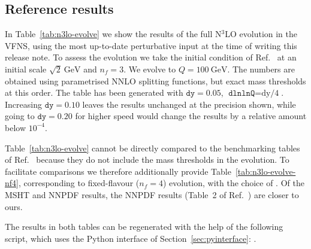 \subsection{Reference results}

In Table~\ref{tab:n3lo-evolve} we show the results of the full N$^3$LO
evolution in the VFNS, using the most up-to-date perturbative input at
the time of writing this release note. To assess the evolution we take
the initial condition of Ref.~\cite{Dittmar:2005ed} at an initial
scale $\sqrt{2}~\text{GeV}$ and $n_f=3$. We evolve to
$Q=100~\text{GeV}$. The numbers are obtained using parametrised NNLO
splitting functions, but exact mass thresholds at this order.
%
The table has been generated with $\texttt{dy}=0.05$,
$\texttt{dlnlnQ}=\text{dy/4}$.
%
Increasing $\texttt{dy}=0.10$ leaves the results unchanged at the
precision shown, while going to $\texttt{dy}=0.20$ for higher speed
would change the results by a relative amount below $10^{-4}$.

Table~\ref{tab:n3lo-evolve} cannot be directly compared to the
benchmarking tables of Ref.~\cite{Cooper-Sarkar:2024crx} because they
do not include the mass thresholds in the \ntlo evolution.
%
To facilitate comparisons we therefore additionally provide
Table~\ref{tab:n3lo-evolve-nf4}, corresponding to fixed-flavour ($n_f=4$)
evolution, with the choice of
.
%
Of the MSHT and NNPDF results, the NNPDF results (Table~2 of
Ref.~\cite{Cooper-Sarkar:2024crx}) are closer to ours.

The results in both tables can be regenerated with the help
of the following script, which uses the Python interface of
Section~\ref{sec:pyinterface}:
.

